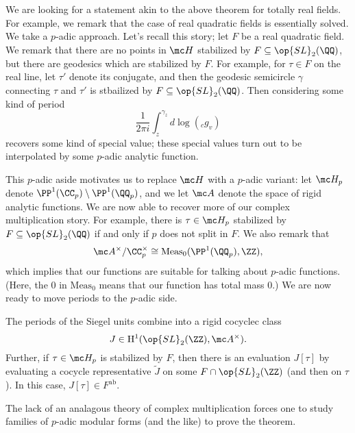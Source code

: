\documentclass{article}
\begin{document}
We are looking for a statement akin to the above theorem for totally real fields. For example, we remark that the case of real quadratic fields is essentially solved. We take a $p$-adic approach. Let's recall this story; let $F$ be a real quadratic field. We remark that there are no points in $\mc H$ stabilized by $F\subseteq\op{SL}_2(\QQ)$, but there are geodesics which are stabilized by $F$. For example, for $\tau\in F$ on the real line, let $\tau'$ denote its conjugate, and then the geodesic semicircle $\gamma$ connecting $\tau$ and $\tau'$ is stbailized by $F\subseteq\op{SL}_2(\QQ)$. Then considering some kind of period
\[\frac1{2\pi i}\int_z^{\gamma_z}d\log({_cg_v})\]
recovers some kind of special value; these special values turn out to be interpolated by some $p$-adic analytic function.

This $p$-adic aside motivates us to replace $\mc H$ with a $p$-adic variant: let $\mc H_p$ denote $\PP^1(\CC_p)\setminus\PP^1(\QQ_p)$, and we let $\mc A$ denote the space of rigid analytic functions. We are now able to recover more of our complex multiplication story. For example, there is $\tau\in\mc H_p$ stabilized by $F\subseteq\op{SL}_2(\QQ)$ if and only if $p$ does not split in $F$. We also remark that
\[\mc A^\times/\CC_p^\times\cong\mathrm{Meas}_0(\PP^1(\QQ_p),\ZZ),\]
which implies that our functions are suitable for talking about $p$-adic functions. (Here, the $0$ in $\mathrm{Meas}_0$ means that our function has total mass $0$.) We are now ready to move periods to the $p$-adic side.
\begin{theorem}
	The periods of the Siegel units combine into a rigid cocyclec class
	\[J\in\mathrm H^1(\op{SL}_2(\ZZ),\mc A^\times).\]
	Further, if $\tau\in\mc H_p$ is stabilized by $F$, then there is an evaluation $J[\tau]$ by evaluating a cocycle representative $\widetilde J$ on some $F\cap\op{SL}_2(\ZZ)$ (and then on $\tau$). In this case, $J[\tau]\in F^{\mathrm{ab}}$.
\end{theorem}
The lack of an analagous theory of complex multiplication forces one to study families of $p$-adic modular forms (and the like) to prove the theorem.
\end{document}
